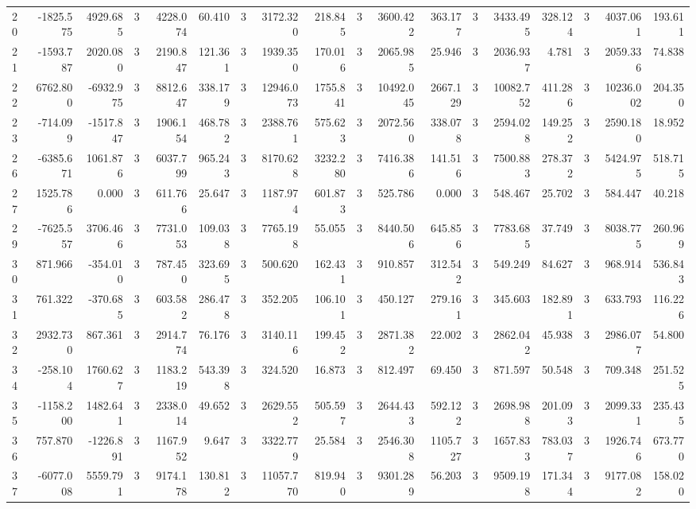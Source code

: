 \begin{table}[ht]
\begin{tabular}{lrrrrrrrrrrrrrrrrr}
20 & -1825.575 & 4929.685 & 3 & 4228.074 & 60.410 & 3 & 3172.320 & 218.845 & 3 & 3600.422 & 363.177 & 3 & 3433.495 & 328.124 & 3 & 4037.061 & 193.611 \\
21 & -1593.787 & 2020.080 & 3 & 2190.847 & 121.361 & 3 & 1939.350 & 170.016 & 3 & 2065.985 & 25.946 & 3 & 2036.937 & 4.781 & 3 & 2059.336 & 74.838 \\
22 & 6762.800 & -6932.975 & 3 & 8812.647 & 338.179 & 3 & 12946.073 & 1755.841 & 3 & 10492.045 & 2667.129 & 3 & 10082.752 & 411.286 & 3 & 10236.002 & 204.350 \\
23 & -714.099 & -1517.847 & 3 & 1906.154 & 468.782 & 3 & 2388.761 & 575.623 & 3 & 2072.560 & 338.078 & 3 & 2594.028 & 149.252 & 3 & 2590.180 & 18.952 \\
26 & -6385.671 & 1061.876 & 3 & 6037.799 & 965.243 & 3 & 8170.628 & 3232.280 & 3 & 7416.386 & 141.516 & 3 & 7500.883 & 278.372 & 3 & 5424.975 & 518.715 \\
27 & 1525.786 & 0.000 & 3 & 611.766 & 25.647 & 3 & 1187.974 & 601.873 & 3 & 525.786 & 0.000 & 3 & 548.467 & 25.702 & 3 & 584.447 & 40.218 \\
29 & -7625.557 & 3706.466 & 3 & 7731.053 & 109.038 & 3 & 7765.198 & 55.055 & 3 & 8440.506 & 645.856 & 3 & 7783.685 & 37.749 & 3 & 8038.775 & 260.969 \\
30 & 871.966 & -354.010 & 3 & 787.450 & 323.695 & 3 & 500.620 & 162.431 & 3 & 910.857 & 312.542 & 3 & 549.249 & 84.627 & 3 & 968.914 & 536.843 \\
31 & 761.322 & -370.685 & 3 & 603.582 & 286.478 & 3 & 352.205 & 106.101 & 3 & 450.127 & 279.161 & 3 & 345.603 & 182.891 & 3 & 633.793 & 116.226 \\
32 & 2932.730 & 867.361 & 3 & 2914.774 & 76.176 & 3 & 3140.116 & 199.452 & 3 & 2871.382 & 22.002 & 3 & 2862.042 & 45.938 & 3 & 2986.077 & 54.800 \\
34 & -258.104 & 1760.627 & 3 & 1183.219 & 543.398 & 3 & 324.520 & 16.873 & 3 & 812.497 & 69.450 & 3 & 871.597 & 50.548 & 3 & 709.348 & 251.525 \\
35 & -1158.200 & 1482.641 & 3 & 2338.014 & 49.652 & 3 & 2629.552 & 505.597 & 3 & 2644.433 & 592.122 & 3 & 2698.988 & 201.093 & 3 & 2099.331 & 235.435 \\
36 & 757.870 & -1226.891 & 3 & 1167.952 & 9.647 & 3 & 3322.779 & 25.584 & 3 & 2546.308 & 1105.727 & 3 & 1657.833 & 783.037 & 3 & 1926.746 & 673.770 \\
37 & -6077.008 & 5559.791 & 3 & 9174.178 & 130.812 & 3 & 11057.770 & 819.940 & 3 & 9301.289 & 56.203 & 3 & 9509.198 & 171.344 & 3 & 9177.082 & 158.020 \\

\end{tabular}
\end{table}
